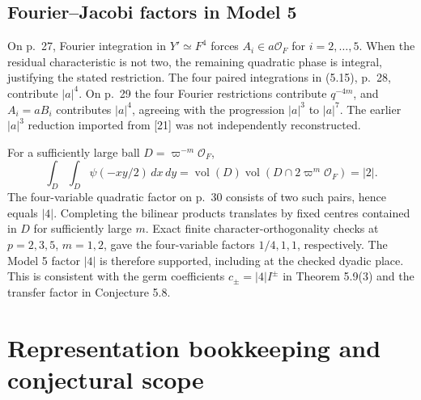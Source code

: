 \documentclass[10pt]{article}
\begin{document}
\subsection*{Fourier–Jacobi factors in Model 5}
On p. 27, Fourier integration in \(Y'\simeq F^4\) forces \(A_i\in a\mathcal O_F\) for \(i=2,\ldots,5\). When the residual characteristic is not two, the remaining quadratic phase is integral, justifying the stated restriction. The four paired integrations in (5.15), p. 28, contribute \(|a|^4\). On p. 29 the four Fourier restrictions contribute \(q^{-4m}\), and \(A_i=aB_i\) contributes \(|a|^4\), agreeing with the progression \(|a|^3\) to \(|a|^7\). The earlier \(|a|^3\) reduction imported from [21] was not independently reconstructed.\par
For a sufficiently large ball \(D=\varpi^{-m}\mathcal O_F\), \[\int_D\int_D\psi(-xy/2)\,dx\,dy
 =\operatorname{vol}(D)\operatorname{vol}(D\cap 2\varpi^m\mathcal O_F)=|2|.\] The four-variable quadratic factor on p. 30 consists of two such pairs, hence equals \(|4|\). Completing the bilinear products translates by fixed centres contained in \(D\) for sufficiently large \(m\). Exact finite character-orthogonality checks at \(p=2,3,5\), \(m=1,2\), gave the four-variable factors \(1/4,1,1\), respectively. The Model 5 factor \(|4|\) is therefore supported, including at the checked dyadic place. This is consistent with the germ coefficients \(c_\pm=|4|I^\pm\) in Theorem 5.9(3) and the transfer factor in Conjecture 5.8.\par
\section*{Representation bookkeeping and conjectural scope}
\end{document}
